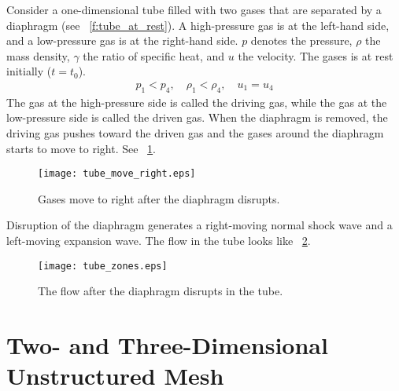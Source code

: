 \documentclass{turgon}
\begin{document}
Consider a one-dimensional tube filled with two gases that are separated by a
diaphragm (see \figurename~\ref{f:tube_at_rest}).  A high-pressure gas is at
the left-hand side, and a low-pressure gas is at the right-hand side.  $p$
denotes the pressure, $\rho$ the mass density, $\gamma$ the ratio of specific
heat, and $u$ the velocity.  The gases is at rest initially ($t = t_0$).
\begin{align}
  p_1 < p_4 , \quad
  \rho_1 < \rho_4, \quad
  u_1 = u_4
\end{align}
The gas at the high-pressure side is called the driving gas, while the gas at
the low-pressure side is called the driven gas.  When the diaphragm is removed,
the driving gas pushes toward the driven gas and the gases around the diaphragm
starts to move to right.  See \figurename~\ref{f:tube_move_right}.

\begin{figure}[h]
\centering
\texttt{[image: tube\_move\_right.eps]}
\caption{Gases move to right after the diaphragm disrupts.}
\label{f:tube_move_right}
\end{figure}

Disruption of the diaphragm generates a right-moving normal shock wave and a
left-moving expansion wave.  The flow in the tube looks like
\figurename~\ref{f:tube_zones}.

\begin{figure}[h]
\centering
\texttt{[image: tube\_zones.eps]}
\caption{The flow after the diaphragm disrupts in the tube.}
\label{f:tube_zones}
\end{figure}


\chapter{Two- and Three-Dimensional Unstructured Mesh}
\label{c:ustm}

\clearpage
{}


\end{document}
